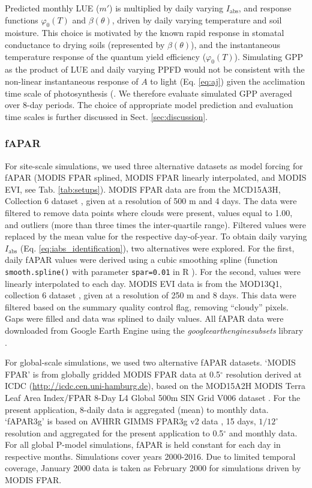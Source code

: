 \documentclass[gmd, manuscript]{copernicus}
\begin{document}
Predicted monthly LUE ($m'$) is multiplied by daily varying $I_\text{abs}$, and response functions $\varphi_0(T)$ and $\beta(\theta)$, driven by daily varying temperature and soil moisture. This choice is motivated by the known rapid response in stomatal conductance to drying soils (represented by $\beta(\theta)$), and the instantaneous temperature response of the quantum yield efficiency ($\varphi_0(T)$). Simulating GPP as the product of LUE and daily varying PPFD would not be consistent with the non-linear instantaneous response of $A$ to light (Eq. \ref{eq:aj}) given the acclimation time scale of photosynthesis (\citep{suzuki01, maire12po}. We therefore evaluate simulated GPP averaged over 8-day periods. The choice of appropriate model prediction and evaluation time scales is further discussed in Sect. \ref{sec:discussion}.  

\subsubsection{fAPAR}
\label{sec:greennessdata}

For site-scale simulations, we used three alternative datasets as model forcing for fAPAR (MODIS FPAR splined, MODIS FPAR linearly interpolated, and MODIS EVI, see Tab. \ref{tab:setups}). MODIS FPAR data are from the MCD15A3H, Collection 6 dataset \citep{modis_fpar_6}, given at a resolution of 500 m and 4 days. The  data were filtered to remove data points where clouds were present, values equal to 1.00, and outliers (more than three times the inter-quartile range). Filtered values were replaced by the mean value for the respective day-of-year. To obtain daily varying $I_\text{abs}$ (Eq. \ref{eq:iabs_identification}), two alternatives were explored. For the first, daily fAPAR values were derived using a cubic smoothing spline (function \texttt{smooth.spline()} with parameter \texttt{spar=0.01} in R \citep{Rcoreteam}). For the second, values were linearly interpolated to each day. MODIS EVI data is from the MOD13Q1, collection 6 dataset \citep{modis_evi_6}, given at a resolution of 250 m and 8 days. This data were filtered based on the summary quality control flag, removing ``cloudy'' pixels. Gaps were filled and data was splined to daily values. All fAPAR data were downloaded from Google Earth Engine using the \textit{google\textunderscore earth\textunderscore engine\textunderscore subsets} library \citep{gee_subset}. 

For global-scale simulations, we used two alternative fAPAR datasets. `MODIS FPAR' is from globally gridded MODIS FPAR data at 0.5$^{\circ}$ resolution derived at ICDC (\url{http://icdc.cen.uni-hamburg.de}), based on the MOD15A2H MODIS Terra Leaf Area Index/FPAR 8-Day L4 Global 500m SIN Grid V006 dataset \citep{modis_MOD15A2H}. For the present application, 8-daily data is aggregated (mean) to monthly data. `fAPAR3g' is based on AVHRR GIMMS FPAR3g v2 data \citep{zhu13rs}, 15 days, $1/12^{\circ}$ resolution and aggregated for the present application to 0.5$^{\circ}$ and monthly data. For all global P-model simulations, fAPAR is held constant for each day in respective months. Simulations cover years 2000-2016. Due to limited temporal coverage, January 2000 data is taken as February 2000 for simulations driven by MODIS FPAR.
\end{document}
